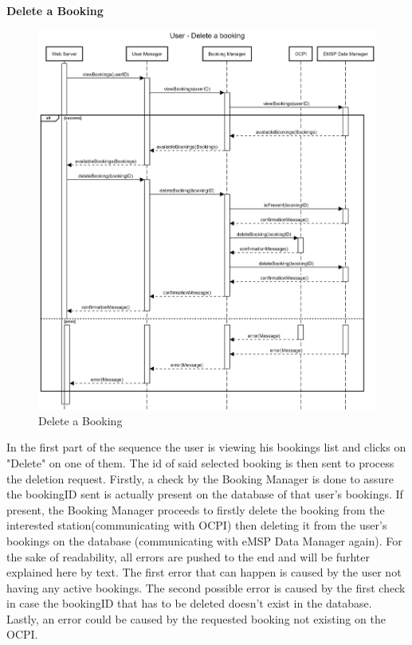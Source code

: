 \documentclass[table, 12pt]{article}
\begin{document}
\newpage

\textbf{Delete a Booking}
\begin{center}
    \begin{figure}[H]
        \includegraphics[scale=0.15, center]{assets/sequenceDiagrams/User delete bookings.png}
        \caption{Delete a Booking}
        \label{Delete Booking}
    \end{figure}
\end{center}
In the first part of the sequence the user is viewing his bookings list and clicks on "Delete" on one of them. The id of said selected booking is then sent to process the deletion request.
Firstly, a check by the Booking Manager is done to assure the bookingID sent is actually present on the database of that user's bookings. If present, the Booking Manager proceeds to firstly delete the booking from the 
interested station(communicating with OCPI) then deleting it from the user's bookings on the database (communicating with eMSP Data Manager again).
 For the sake of readability, all errors are pushed to the end and will be furhter explained here by text. The first error that can happen is caused by the user not having any active bookings.
 The second possible error is caused by the first check in case the bookingID that has to be deleted doesn't exist in the database.
 Lastly, an error could be caused by the requested booking not existing on the OCPI. 
\end{document}
